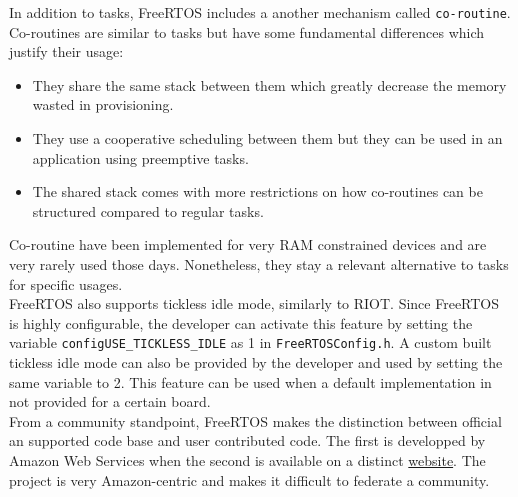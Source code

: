 In addition to tasks, FreeRTOS includes a another mechanism called \texttt{co-routine}.
Co-routines are similar to tasks but have some fundamental differences which justify their usage:
\begin{itemize}
    \item They share the same stack between them which greatly decrease the memory wasted in provisioning.
    \item They use a cooperative scheduling between them but they can be used in an application using preemptive tasks.
    \item The shared stack comes with more restrictions on how co-routines can be structured compared to regular tasks.
\end{itemize}
Co-routine have been implemented for very RAM constrained devices and are very rarely used those days.
Nonetheless, they stay a relevant alternative to tasks for specific usages.\\
FreeRTOS also supports tickless idle mode, similarly to RIOT.
Since FreeRTOS is highly configurable, the developer can activate this feature 
    by setting the variable \texttt{configUSE\_TICKLESS\_IDLE} as 1 in \texttt{FreeRTOSConfig.h}.
A custom built tickless idle mode can also be provided by the developer and used by setting the same variable to 2.
This feature can be used when a default implementation in not provided for a certain board.\\

From a community standpoint, FreeRTOS makes the distinction between official an supported code base and user contributed code.
The first is developped by Amazon Web Services when the second is available on a distinct \href{https://interactive.freertos.org/hc/en-us}{website}.%
The project is very Amazon-centric and makes it difficult to federate a community.